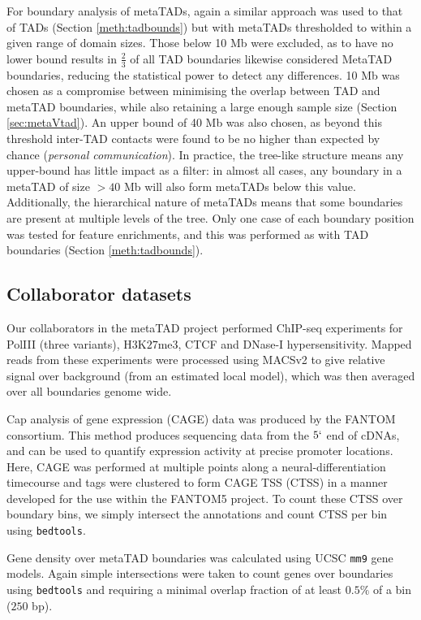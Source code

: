 \documentclass[a4paper,11pt,oneside]{book}
\begin{document}
For boundary analysis of metaTADs, again a similar approach was used to that of TADs (Section \ref{meth:tadbounds}) but with metaTADs thresholded to within a given range of domain sizes. Those below 10 Mb were excluded, as to have no lower bound results in $\frac{2}{3}$ of all TAD boundaries likewise considered MetaTAD boundaries, reducing the statistical power to detect any differences. 10 Mb was chosen as a compromise between minimising the overlap between TAD and metaTAD boundaries, while also retaining a large enough sample size (Section \ref{sec:metaVtad}). An upper bound of 40 Mb was also chosen, as beyond this threshold inter-TAD contacts were found to be no higher than expected by chance (\emph{personal communication}). In practice, the tree-like structure means any upper-bound has little impact as a filter: in almost all cases, any boundary in a metaTAD of size $> 40$ Mb will also form metaTADs below this value. Additionally, the hierarchical nature of metaTADs means that some boundaries are present at multiple levels of the tree. Only one case of each boundary position was tested for feature enrichments, and this was performed as with TAD boundaries (Section \ref{meth:tadbounds}).

\subsection{Collaborator datasets}\label{meth:metadata}
Our collaborators in the metaTAD project performed ChIP-seq experiments for PolIII (three variants), H$3$K$27$me$3$, CTCF and DNase-I hypersensitivity. Mapped reads from these experiments were processed using MACSv2\cite{Zhang2008} to give relative signal over background (from an estimated local model), which was then averaged over all boundaries genome wide. 

Cap analysis of gene expression (CAGE) data was produced by the FANTOM consortium.\cite{fantom5, itoh2012a} This method produces sequencing data from the $5`$ end of cDNAs, and can be used to quantify expression activity at precise promoter locations.\cite{Kodzius2006} Here, CAGE was performed at multiple points along a neural-differentiation timecourse and tags were clustered to form CAGE TSS (CTSS) in a manner developed for the use within the FANTOM5 project.\cite{fantom5} To count these CTSS over boundary bins, we simply intersect the annotations and count CTSS per bin using \texttt{bedtools}.\cite{Quinlan2010}

Gene density over metaTAD boundaries was calculated using UCSC \texttt{mm9} gene models.\cite{Karolchik2014} Again simple intersections were taken to count genes over boundaries using \texttt{bedtools}\cite{Quinlan2010} and requiring a minimal overlap fraction of at least $0.5\%$ of a bin ($250$ bp).
\end{document}
